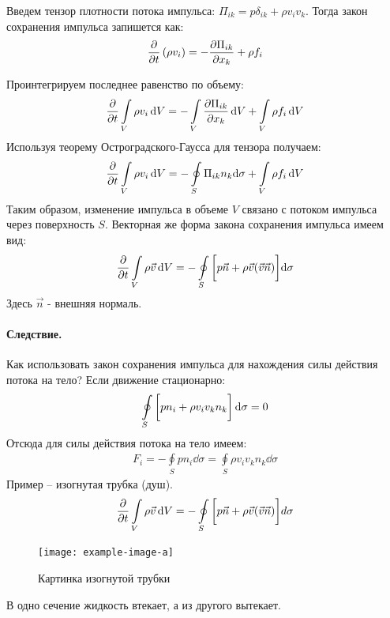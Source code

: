 Введем тензор плотности потока импульса: $ \Pi _ { i k } = p \delta _ { i k } + \rho v _ { i } v _ { k } $. Тогда закон сохранения импульса запишется как:
\begin{align*}
\pdv{t} \left( \rho v _ { i } \right) = - \frac { \partial \Pi _ { i k } } { \partial x _ { k } } + \rho f _ { i }
\end{align*}

Проинтегрируем последнее равенство по объему:
\begin{align*}
\pdv{t} \int \limits_{ V } \rho v _ { i }\dd{V} = - \int \limits_{ V } \frac { \partial \Pi _ { i k } } { \partial x _ { k } }\dd{V} + \int \limits_{ V } \rho f _ { i }\dd{V}
\end{align*}
Используя теорему Остроградского-Гаусса для тензора получаем:
\begin{align*}
\pdv{t} \int \limits_ { V } \rho v _ { i }\dd{V} = - \oint \limits_ { S } \Pi _ { i k } n _ { k } \dd \sigma + \int \limits_ { V } \rho f _ { i }\dd{V}
\end{align*}
Таким образом, изменение импульса в объеме $V$ связано с потоком импульса через поверхность $S$. Векторная же форма закона сохранения импульса имеем вид:
\begin{align*}
\pdv{t} \int \limits_ { V } \rho  \vec{v}\dd{V}  = - \oint \limits_ { S } \qty[\vphantom{\int} p \vec { n } + \rho \vec{v} ( \vec{v} \vec{n} ) ]\dd\sigma
\end{align*}
Здесь $\vec{n}$ - внешняя нормаль.

\paragraph{Следствие.} Как использовать закон сохранения импульса для нахождения силы действия потока на тело? Если движение стационарно:
\begin{align*}
\oint\limits_{ S } \left[\vphantom{\int} p n _ { i } + \rho v _ { i } v _ { k } n _ { k } \right] \dd \sigma = 0
\end{align*}
Отсюда для силы действия потока на тело имеем:
\begin{align*}
F _ { i } = - \oint \limits_ { S } p n _ { i } \dd \sigma = \oint \limits_ { S } \rho v _ { i } v _ { k } n _ { k } \dd \sigma
\end{align*}
Пример -- изогнутая трубка (душ).
\begin{align*}
\pdv{t} \int \limits_ { V } \rho  \vec{v}\dd{V}  = - \oint \limits_ { S } \qty[\vphantom{\int} p \vec { n } + \rho \vec{v} ( \vec{v} \vec{n} ) ]d \sigma
\end{align*}
\begin{figure}[H]
	\centering
	\texttt{[image: example-image-a]}
	\caption{Картинка изогнутой трубки}
	\label{fig:figure5}
\end{figure}
В одно сечение жидкость втекает, а из другого вытекает.


